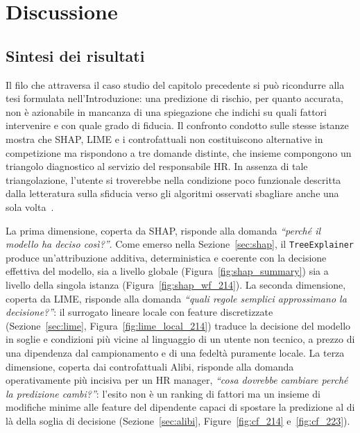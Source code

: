 \chapter{Discussione}
\label{chap:discussione}

\section{Sintesi dei risultati}
\label{sec:discussione_sintesi}

Il filo che attraversa il caso studio del capitolo precedente si può ricondurre alla tesi formulata nell'Introduzione: una predizione di rischio, per quanto accurata, non è azionabile in mancanza di una spiegazione che indichi su quali fattori intervenire e con quale grado di fiducia. Il confronto condotto sulle stesse istanze mostra che SHAP, LIME e i controfattuali non costituiscono alternative in competizione ma rispondono a tre domande distinte, che insieme compongono un triangolo diagnostico al servizio del responsabile HR. In assenza di tale triangolazione, l'utente si troverebbe nella condizione poco funzionale descritta dalla letteratura sulla sfiducia verso gli algoritmi osservati sbagliare anche una sola volta~\cite{dietvorst2015algorithm}.

La prima dimensione, coperta da SHAP, risponde alla domanda \emph{``perché il modello ha deciso così?''}. Come emerso nella Sezione~\ref{sec:shap}, il \texttt{TreeExplainer} produce un'attribuzione additiva, deterministica e coerente con la decisione effettiva del modello, sia a livello globale (Figura~\ref{fig:shap_summary}) sia a livello della singola istanza (Figura~\ref{fig:shap_wf_214}). La seconda dimensione, coperta da LIME, risponde alla domanda \emph{``quali regole semplici approssimano la decisione?''}: il surrogato lineare locale con feature discretizzate (Sezione~\ref{sec:lime}, Figura~\ref{fig:lime_local_214}) traduce la decisione del modello in soglie e condizioni più vicine al linguaggio di un utente non tecnico, a prezzo di una dipendenza dal campionamento e di una fedeltà puramente locale. La terza dimensione, coperta dai controfattuali Alibi, risponde alla domanda operativamente più incisiva per un HR manager, \emph{``cosa dovrebbe cambiare perché la predizione cambi?''}: l'esito non è un ranking di fattori ma un insieme di modifiche minime alle feature del dipendente capaci di spostare la predizione al di là della soglia di decisione (Sezione~\ref{sec:alibi}, Figure~\ref{fig:cf_214} e~\ref{fig:cf_223}).

